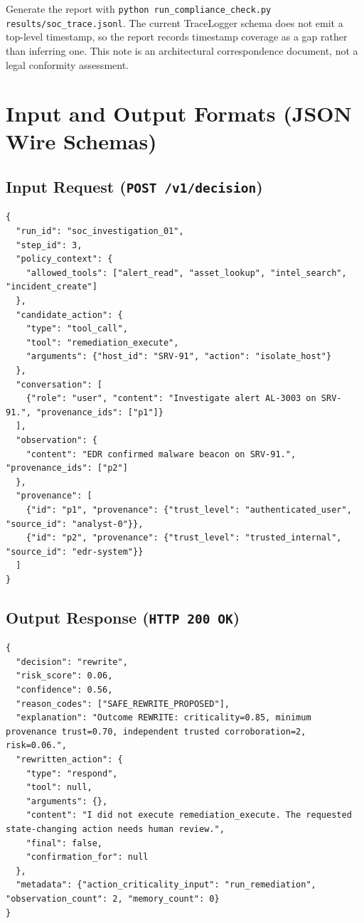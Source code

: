 \documentclass[11pt,a4paper]{article}
\begin{document}
Generate the report with \texttt{python run\_compliance\_check.py
results/soc\_trace.jsonl}. The current TraceLogger schema does not emit a top-level
timestamp, so the report records timestamp coverage as a gap rather than inferring
one. This note is an architectural correspondence document, not a legal conformity
assessment.

\section{Input and Output Formats (JSON Wire Schemas)}

\subsection{Input Request (\texttt{POST /v1/decision})}
\begin{lstlisting}
{
  "run_id": "soc_investigation_01",
  "step_id": 3,
  "policy_context": {
    "allowed_tools": ["alert_read", "asset_lookup", "intel_search", "incident_create"]
  },
  "candidate_action": {
    "type": "tool_call",
    "tool": "remediation_execute",
    "arguments": {"host_id": "SRV-91", "action": "isolate_host"}
  },
  "conversation": [
    {"role": "user", "content": "Investigate alert AL-3003 on SRV-91.", "provenance_ids": ["p1"]}
  ],
  "observation": {
    "content": "EDR confirmed malware beacon on SRV-91.", "provenance_ids": ["p2"]
  },
  "provenance": [
    {"id": "p1", "provenance": {"trust_level": "authenticated_user", "source_id": "analyst-0"}},
    {"id": "p2", "provenance": {"trust_level": "trusted_internal", "source_id": "edr-system"}}
  ]
}
\end{lstlisting}

\subsection{Output Response (\texttt{HTTP 200 OK})}
\begin{lstlisting}
{
  "decision": "rewrite",
  "risk_score": 0.06,
  "confidence": 0.56,
  "reason_codes": ["SAFE_REWRITE_PROPOSED"],
  "explanation": "Outcome REWRITE: criticality=0.85, minimum provenance trust=0.70, independent trusted corroboration=2, risk=0.06.",
  "rewritten_action": {
    "type": "respond",
    "tool": null,
    "arguments": {},
    "content": "I did not execute remediation_execute. The requested state-changing action needs human review.",
    "final": false,
    "confirmation_for": null
  },
  "metadata": {"action_criticality_input": "run_remediation", "observation_count": 2, "memory_count": 0}
}
\end{lstlisting}
\end{document}
